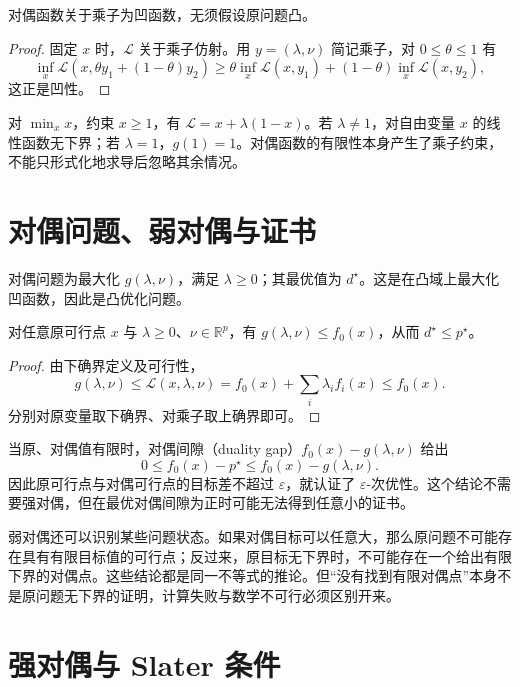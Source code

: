 \begin{proposition}
对偶函数关于乘子为凹函数，无须假设原问题凸。
\end{proposition}
\begin{proof}
固定 $x$ 时，$\mathcal L$ 关于乘子仿射。用 $y=(\lambda,\nu)$ 简记乘子，对 $0\leq\theta\leq1$ 有
\[
 \inf_x\mathcal L(x,\theta y_1+(1-\theta)y_2)
 \geq\theta\inf_x\mathcal L(x,y_1)+(1-\theta)\inf_x\mathcal L(x,y_2),
\]
这正是凹性。
\end{proof}

\begin{example}
对 $\min_x x$，约束 $x\geq1$，有 $\mathcal L=x+\lambda(1-x)$。若 $\lambda\ne1$，对自由变量 $x$ 的线性函数无下界；若 $\lambda=1$，$g(1)=1$。对偶函数的有限性本身产生了乘子约束，不能只形式化地求导后忽略其余情况。
\end{example}

\section{对偶问题、弱对偶与证书}

对偶问题为最大化 $g(\lambda,\nu)$，满足 $\lambda\geq0$；其最优值为 $d^\star$。这是在凸域上最大化凹函数，因此是凸优化问题。

\begin{theorem}[弱对偶]
对任意原可行点 $x$ 与 $\lambda\geq0$、$\nu\in\mathbb R^p$，有 $g(\lambda,\nu)\leq f_0(x)$，从而 $d^\star\leq p^\star$。
\end{theorem}
\begin{proof}
由下确界定义及可行性，
\[
 g(\lambda,\nu)\leq\mathcal L(x,\lambda,\nu)
 =f_0(x)+\sum_i\lambda_i f_i(x)\leq f_0(x).
\]
分别对原变量取下确界、对乘子取上确界即可。
\end{proof}

当原、对偶值有限时，对偶间隙（duality gap）$f_0(x)-g(\lambda,\nu)$ 给出
\[
 0\leq f_0(x)-p^\star\leq f_0(x)-g(\lambda,\nu).
\]
因此原可行点与对偶可行点的目标差不超过 $\varepsilon$，就认证了 $\varepsilon$-次优性。这个结论不需要强对偶，但在最优对偶间隙为正时可能无法得到任意小的证书。

弱对偶还可以识别某些问题状态。如果对偶目标可以任意大，那么原问题不可能存在具有有限目标值的可行点；反过来，原目标无下界时，不可能存在一个给出有限下界的对偶点。这些结论都是同一不等式的推论。但“没有找到有限对偶点”本身不是原问题无下界的证明，计算失败与数学不可行必须区别开来。

\section{强对偶与 Slater 条件}

